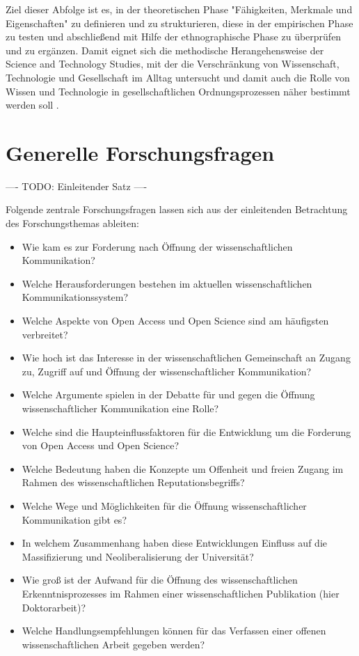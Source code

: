 Ziel dieser Abfolge ist es, in der theoretischen Phase "Fähigkeiten, Merkmale und Eigenschaften" \cite{raab_2012_fragebogen} zu definieren und zu strukturieren, diese in der empirischen Phase zu testen und abschließend mit Hilfe der ethnographische Phase zu überprüfen und zu ergänzen. Damit eignet sich die methodische Herangehensweise der Science and Technology Studies, mit der die Verschränkung von Wissenschaft, Technologie und Gesellschaft im Alltag untersucht und damit auch die Rolle von Wissen und Technologie in gesellschaftlichen Ordnungsprozessen näher bestimmt werden soll \cite{beck_2014_science}.

\section{Generelle Forschungsfragen}

---- TODO: Einleitender Satz ----

Folgende zentrale Forschungsfragen lassen sich aus der einleitenden Betrachtung des Forschungsthemas ableiten:
\begin{itemize}
\item Wie kam es zur Forderung nach Öffnung der wissenschaftlichen Kommunikation?
\item Welche Herausforderungen bestehen im aktuellen wissenschaftlichen Kommunikationssystem?
\item Welche Aspekte von Open Access und Open Science sind am häufigsten verbreitet?
\item Wie hoch ist das Interesse in der wissenschaftlichen Gemeinschaft an Zugang zu, Zugriff auf und Öffnung der wissenschaftlicher Kommunikation?
\item Welche Argumente spielen in der Debatte für und gegen die Öffnung wissenschaftlicher Kommunikation eine Rolle?
\item Welche sind die Haupteinflussfaktoren für die Entwicklung um die Forderung von Open Access und Open Science?
\item Welche Bedeutung haben die Konzepte um Offenheit und freien Zugang im Rahmen des wissenschaftlichen Reputationsbegriffs?
\item Welche Wege und Möglichkeiten für die Öffnung wissenschaftlicher Kommunikation gibt es?
\item In welchem Zusammenhang haben diese Entwicklungen Einfluss auf die Massifizierung und Neoliberalisierung der Universität?
\item Wie groß ist der Aufwand für die Öffnung des wissenschaftlichen Erkenntnisprozesses im Rahmen einer wissenschaftlichen Publikation (hier Doktorarbeit)?
\item Welche Handlungsempfehlungen können für das Verfassen einer offenen wissenschaftlichen Arbeit gegeben werden?
\end{itemize}

